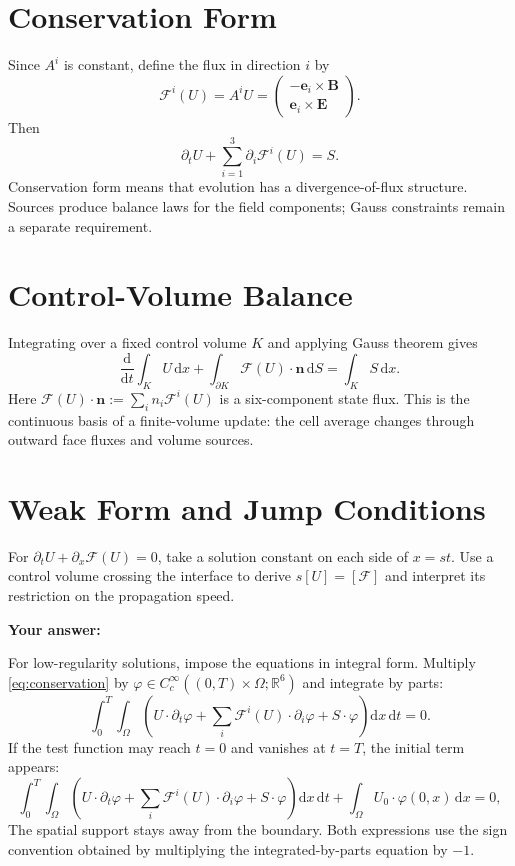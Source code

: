 \documentclass[11pt,openany]{book}
\numberwithin{equation}{chapter}
\theoremstyle{definition}
\theoremstyle{remark}
\newcommand{\dd}{\mathrm d}
\newcommand{\RR}{\mathbb R}
\newcommand{\mat}[1]{\begin{pmatrix}#1\end{pmatrix}}
\begin{document}
\section{Conservation Form}
Since $A^i$ is constant, define the flux in direction $i$ by
\begin{equation}\label{eq:flux}
\mathcal F^i(U)=A^iU
=\mat{-\bm e_i\times\bm B\\ \bm e_i\times\bm E}.
\end{equation}
Then
\begin{equation}\label{eq:conservation}
\boxed{\partial_tU+\sum_{i=1}^3\partial_i\mathcal F^i(U)=S.}
\end{equation}
Conservation form means that evolution has a divergence-of-flux structure. Sources produce balance laws for the field components; Gauss constraints remain a separate requirement.

\section{Control-Volume Balance}
Integrating over a fixed control volume $K$ and applying Gauss theorem gives
\begin{equation}\label{eq:finitevolumeintegral}
\frac{\dd}{\dd t}\int_K U\,\dd x
+\int_{\partial K}\mathcal F(U)\cdot\bm n\,\dd S
=\int_KS\,\dd x.
\end{equation}
Here $\mathcal F(U)\cdot\bm n:=\sum_i n_i\mathcal F^i(U)$ is a six-component state flux. This is the continuous basis of a finite-volume update: the cell average changes through outward face fluxes and volume sources.

\section{Weak Form and Jump Conditions}
\begin{studentinput}
For $\partial_tU+\partial_x\mathcal F(U)=0$, take a solution constant on each side of $x=st$. Use a control volume crossing the interface to derive $s[U]=[\mathcal F]$ and interpret its restriction on the propagation speed.

\textbf{Your answer:}\vspace{2cm}
\end{studentinput}
For low-regularity solutions, impose the equations in integral form. Multiply \eqref{eq:conservation} by $\varphi\in C_c^\infty((0,T)\times\Omega;\RR^6)$ and integrate by parts:
\begin{equation}\label{eq:weakinternal}
\int_0^T\!\int_\Omega
\left(U\cdot\partial_t\varphi+
\sum_i\mathcal F^i(U)\cdot\partial_i\varphi+S\cdot\varphi\right)\dd x\,\dd t=0.
\end{equation}
If the test function may reach $t=0$ and vanishes at $t=T$, the initial term appears:
\begin{equation}\label{eq:weakinit}
\int_0^T\!\int_\Omega
\left(U\cdot\partial_t\varphi+
\sum_i\mathcal F^i(U)\cdot\partial_i\varphi+S\cdot\varphi\right)\dd x\,\dd t
+\int_\Omega U_0\cdot\varphi(0,x)\,\dd x=0,
\end{equation}
The spatial support stays away from the boundary. Both expressions use the sign convention obtained by multiplying the integrated-by-parts equation by $-1$.
\end{document}
